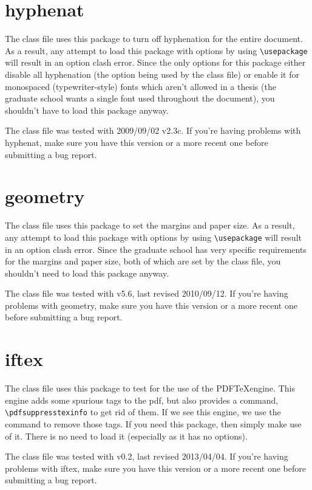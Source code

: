 \section{hyphenat}
The class file uses this package to turn off hyphenation for the entire document.  As a result, any attempt to load this package with options by using \verb=\usepackage= will result in an option clash error.  Since the only options for this package either disable all hyphenation (the option being used by the class file) or enable it for monospaced (typewriter-style) fonts which aren't allowed in a thesis (the graduate school wants a single font used throughout the document), you shouldn't have to load this package anyway.

The class file was tested with 2009/09/02 v2.3c.  If you're having problems with hyphenat, make sure you have this version or a more recent one before submitting a bug report.

\section{geometry}
The class file uses this package to set the margins and paper size.  As a result, any attempt to load this package with options by using \verb=\usepackage= will result in an option clash error.  Since the graduate school has very specific requirements for the margins and paper size, both of which are set by the class file, you shouldn't need to load this package anyway.

The class file was tested with v5.6, last revised 2010/09/12.  If you're having problems with geometry, make sure you have this version or a more recent one before submitting a bug report.

\section{iftex}
The class file uses this package to test for the use of the PDF\TeX engine.  This engine adds some spurious tags to the pdf, but also provides a command, \verb=\pdfsuppresstexinfo= to get rid of them.  If we see this engine, we use the command to remove those tags.  If you need this package, then simply make use of it.  There is no need to load it (especially as it has no options).

The class file was tested with v0.2, last revised 2013/04/04.  If you're having problems with iftex, make sure you have this version or a more recent one before submitting a bug report.

\endinput